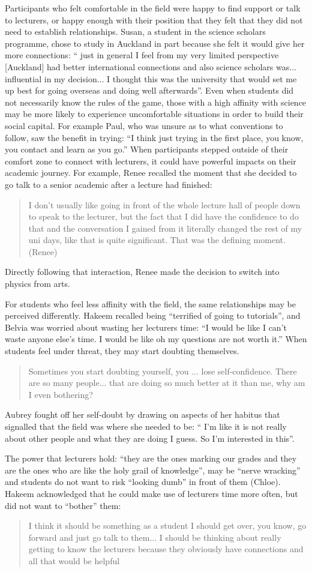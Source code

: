 Participants who felt comfortable in the field were happy to find support or talk to lecturers, or happy enough with their position that they felt that they did not need to establish relationships. Susan, a student in the science scholars programme, chose to study in Auckland in part because she felt it would give her more connections: `` just in general I feel from my very limited perspective [Auckland] had better international connections and also science scholars was... influential in my decision... I thought this was the university that would set me up best for going overseas and doing well afterwards''. Even when students did not necessarily know the rules of the game, those with a high affinity with science may be more likely to experience uncomfortable situations in order to build their social capital. For example Paul, who was unsure as to what conventions to follow, saw the benefit in trying: ``I think just trying in the first place, you know, you contact and learn as you go.'' When participants stepped outside of their comfort zone to connect with lecturers, it could have powerful impacts on their academic journey. For example, Renee recalled the moment that she decided to go talk to a senior academic after a lecture had finished: \blockquote{I don't usually like going in front of the whole lecture hall of people down to speak to the lecturer, but the fact that I did have the confidence to do that and the conversation I gained from it literally changed the rest of my uni days, like that is quite significant. That was the defining moment. (Renee)}  Directly following that interaction, Renee made the decision to switch into physics from arts.


For students who feel less affinity with the field, the same relationships may be perceived differently. Hakeem recalled being ``terrified of going to tutorials'', and Belvia was worried about wasting her lecturers time: ``I would be like I can’t waste anyone else’s time. I would be like oh my questions are not worth it.'' When students feel under threat, they may start doubting themselves. \blockquote{Sometimes you start doubting yourself, you ... lose self-confidence. There are so many people... that are doing so much better at it than me, why am I even bothering?} Aubrey fought off her self-doubt by drawing on aspects of her habitus that signalled that the field was where she needed to be: `` I'm like it is not really about other people and what they are doing I guess. So I’m interested in this''.

The power that lecturers hold: ``they are the ones marking our grades and they are the ones who are like the holy grail of knowledge'', may be ``nerve wracking'' and students do not want to risk ``looking dumb'' in front of them (Chloe). Hakeem acknowledged that he could make use of lecturers time more often, but did not want to ``bother''  them: \blockquote{I think it should be something as a student I should get over, you know, go forward and just go talk to them... I should be thinking about really getting to know the lecturers because they obviously have connections and all that would be helpful}. 

